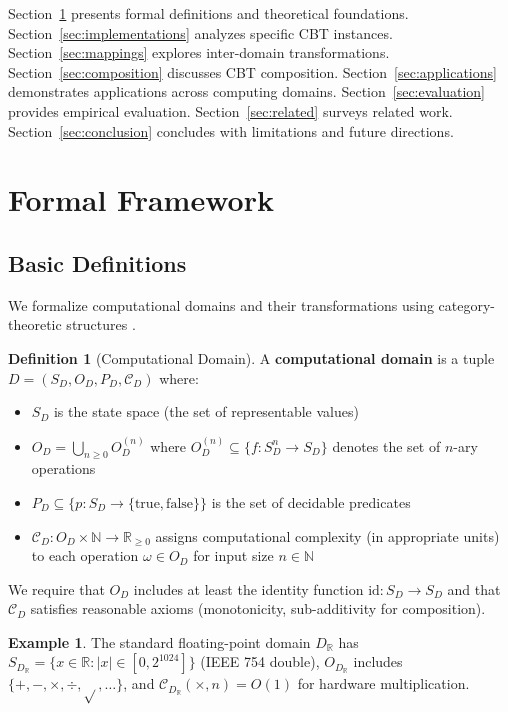 \documentclass[11pt]{article}
\theoremstyle{definition}
\newtheorem{definition}{Definition}
\newtheorem{example}{Example}
\begin{document}
Section~\ref{sec:framework} presents formal definitions and theoretical foundations. Section~\ref{sec:implementations} analyzes specific CBT instances. Section~\ref{sec:mappings} explores inter-domain transformations. Section~\ref{sec:composition} discusses CBT composition. Section~\ref{sec:applications} demonstrates applications across computing domains. Section~\ref{sec:evaluation} provides empirical evaluation. Section~\ref{sec:related} surveys related work. Section~\ref{sec:conclusion} concludes with limitations and future directions.

\section{Formal Framework}
\label{sec:framework}

\subsection{Basic Definitions}

We formalize computational domains and their transformations using category-theoretic structures \cite{awodey2010category}.

\begin{definition}[Computational Domain]
\label{def:domain}
A \textbf{computational domain} is a tuple $D = (S_D, O_D, P_D, \mathcal{C}_D)$ where:
\begin{itemize}
\item $S_D$ is the state space (the set of representable values)
\item $O_D = \bigcup_{n \geq 0} O_D^{(n)}$ where $O_D^{(n)} \subseteq \{f: S_D^n \to S_D\}$ denotes the set of $n$-ary operations
\item $P_D \subseteq \{p: S_D \to \{\mathrm{true}, \mathrm{false}\}\}$ is the set of decidable predicates
\item $\mathcal{C}_D: O_D \times \mathbb{N} \to \mathbb{R}_{\geq 0}$ assigns computational complexity (in appropriate units) to each operation $\omega \in O_D$ for input size $n \in \mathbb{N}$
\end{itemize}
We require that $O_D$ includes at least the identity function $\mathrm{id}: S_D \to S_D$ and that $\mathcal{C}_D$ satisfies reasonable axioms (monotonicity, sub-additivity for composition).
\end{definition}

\begin{example}
The standard floating-point domain $D_{\mathbb{R}}$ has $S_{D_{\mathbb{R}}} = \{x \in \mathbb{R} : |x| \in [0, 2^{1024}]\}$ (IEEE 754 double), $O_{D_{\mathbb{R}}}$ includes $\{+, -, \times, \div, \sqrt{}, \ldots\}$, and $\mathcal{C}_{D_{\mathbb{R}}}(\times, n) = O(1)$ for hardware multiplication.
\end{example}
\end{document}
